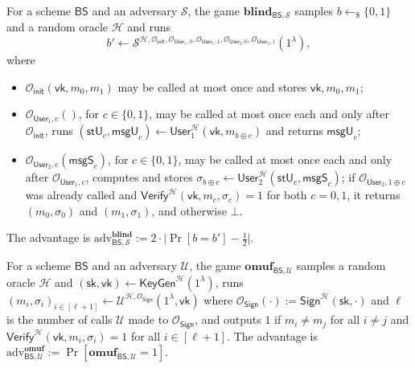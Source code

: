 \documentclass{aicr-conjecture}
\newcommand{\HH}{\mathcal{H}}
\newcommand{\BS}{\mathsf{BS}}
\newcommand{\KeyGen}{\mathsf{KeyGen}}
\newcommand{\Userone}{\mathsf{User}_1}
\newcommand{\Usertwo}{\mathsf{User}_2}
\newcommand{\Sig}{\mathsf{Sign}}
\newcommand{\Ver}{\mathsf{Verify}}
\newcommand{\sky}{\mathsf{sk}}
\newcommand{\vky}{\mathsf{vk}}
\newcommand{\stU}{\mathsf{stU}}
\newcommand{\msgU}{\mathsf{msgU}}
\newcommand{\msgS}{\mathsf{msgS}}
\newcommand{\OSign}{\mathcal{O}_{\mathsf{Sign}}}
\newcommand{\Oinit}{\mathcal{O}_{\mathsf{init}}}
\newcommand{\adv}{\mathrm{adv}}
\begin{document}
\begin{definition}[Blindness]\label{def:blind}
For a scheme $\BS$ and an adversary $\mathcal{S}$, the game
$\mathbf{blind}_{\BS,\mathcal{S}}$ samples $b\leftarrow_{\$}\{0,1\}$ and
a random oracle $\HH$ and runs
\[
  b'\leftarrow\mathcal{S}^{\HH,\Oinit,\mathcal{O}_{\Userone,0},
  \mathcal{O}_{\Userone,1},\mathcal{O}_{\Usertwo,0},
  \mathcal{O}_{\Usertwo,1}}(1^{\lambda}),
\]
where
\begin{itemize}
  \item $\Oinit(\vky,m_{0},m_{1})$ may be called at most once and stores
    $\vky,m_{0},m_{1}$;
  \item $\mathcal{O}_{\Userone,c}()$, for $c\in\{0,1\}$, may be called at
    most once each and only after $\Oinit$, runs
    $(\stU_{c},\msgU_{c})\leftarrow\Userone^{\HH}(\vky,m_{b\oplus c})$
    and returns $\msgU_{c}$;
  \item $\mathcal{O}_{\Usertwo,c}(\msgS_{c})$, for $c\in\{0,1\}$, may be
    called at most once each and only after $\mathcal{O}_{\Userone,c}$,
    computes and stores
    $\sigma_{b\oplus c}\leftarrow\Usertwo^{\HH}(\stU_{c},\msgS_{c})$; if
    $\mathcal{O}_{\Usertwo,1\oplus c}$ was already called and
    $\Ver^{\HH}(\vky,m_{c},\sigma_{c})=1$ for both $c=0,1$, it returns
    $(m_{0},\sigma_{0})$ and $(m_{1},\sigma_{1})$, and otherwise $\bot$.
\end{itemize}
The advantage is
$\adv^{\mathbf{blind}}_{\BS,\mathcal{S}}
 :=2\cdot\bigl|\Pr[b=b']-\tfrac{1}{2}\bigr|$.
\end{definition}

\begin{definition}\label{def:omuf}
For a scheme $\BS$ and an adversary $\mathcal{U}$, the game
$\mathbf{omuf}_{\BS,\mathcal{U}}$ samples a random oracle $\HH$ and
$(\sky,\vky)\leftarrow\KeyGen^{\HH}(1^{\lambda})$, runs
$(m_{i},\sigma_{i})_{i\in[\ell+1]}\leftarrow
\mathcal{U}^{\HH,\OSign}(1^{\lambda},\vky)$ where
$\OSign(\cdot):=\Sig^{\HH}(\sky,\cdot)$ and $\ell$ is the number of
calls $\mathcal{U}$ made to $\OSign$, and outputs $1$ if
$m_{i}\ne m_{j}$ for all $i\ne j$ and
$\Ver^{\HH}(\vky,m_{i},\sigma_{i})=1$ for all $i\in[\ell+1]$. The
advantage is
$\adv^{\mathbf{omuf}}_{\BS,\mathcal{U}}
 :=\Pr[\mathbf{omuf}_{\BS,\mathcal{U}}=1]$.
\end{definition}
\end{document}
